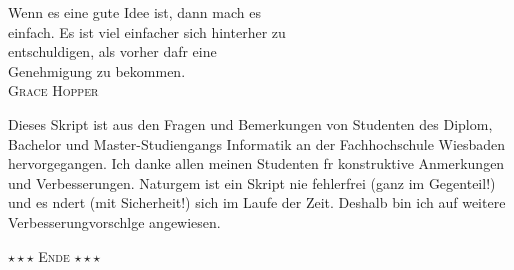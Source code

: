 \documentclass[11pt, a4paper, twoside]{scrartcl}
\begin{document}
\vspace*{1cm}

\begin{raggedleft}
Wenn es eine gute Idee ist, dann mach es\\ 
einfach. Es ist viel einfacher sich hinterher zu\\
entschuldigen, als vorher dafr eine\\
Genehmigung zu bekommen.\\[\medskipamount]
\hfill \textsc{Grace Hopper}%
\end{raggedleft}

\vfill

Dieses Skript ist aus den Fragen und Bemerkungen von Studenten
des Diplom, Bachelor und Master-Studiengangs Informatik an der 
Fachhochschule Wiesbaden hervorgegangen. Ich danke allen meinen Studenten fr
konstruktive Anmerkungen und Verbesserungen. Naturgem ist ein Skript
nie fehlerfrei (ganz im Gegenteil!) und es ndert (mit Sicherheit!)
sich im Laufe der Zeit. Deshalb bin ich auf weitere Verbesserungvorschlge 
angewiesen.

\cleardoublepage

\tableofcontents

\cleardoublepage

\pagestyle{headings}
\pagestyle{fancy}
	











\begin{center}
\mbox{}
\vfill
$\star \star \star$ \textsc{Ende} $\star \star \star$
\end{center}

\appendix

\cleardoublepage
{}
\def\indexname{Stichwortverzeichnis}
\makeatletter
\printindex
\makeatother

\cleardoublepage
{}
\def\bibname{Literatur}

\end{document}
